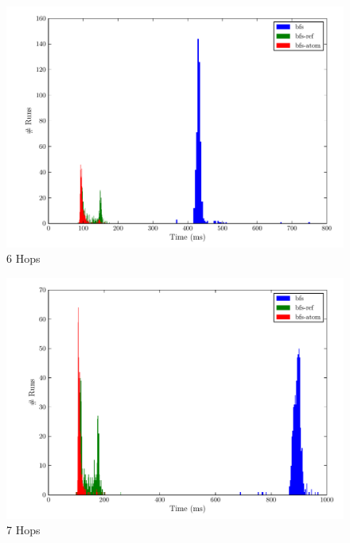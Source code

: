 \documentclass[12pt,letterpaper,oneside,notitlepage]{report}
\theoremstyle{definition}
\begin{document}
		\begin{figure}[!ht]
			\centering
			\includegraphics[scale=0.85]{6_hops}
			\caption{6 Hops}
			\label{fig:perf-6-hops}
		\end{figure}
		
		\begin{figure}[!ht]
			\centering
			\includegraphics[scale=0.85]{7_hops}
			\caption{7 Hops}
			\label{fig:perf-7-hops}
		\end{figure}
		
\end{document}

